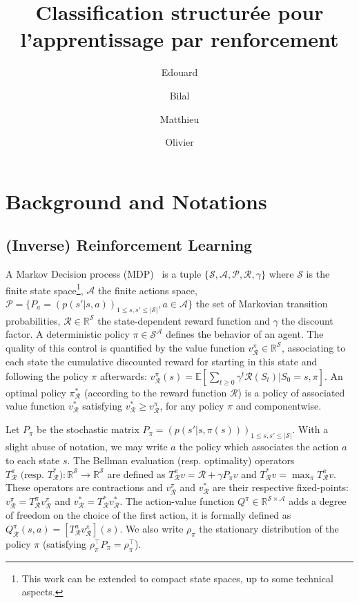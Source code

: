 \documentclass[english,utf8]{./hermes-journal}
\title[SCIRL]{Classification structurée pour l'apprentissage par renforcement}
\author[1,2]{Edouard}{Klein}
\author[2]{Bilal}{Piot}
\author[2,3]{Matthieu}{Geist}
\author[2,3]{Olivier}{Pietquin}
\newcommand{\p}{\mathcal{P}}
\newcommand{\R}{\mathcal{R}}
\newcommand{\s}{\mathcal{S}}
\newcommand{\A}{\mathcal{A}}
\newcommand{\E}{\mathbb{E}}
\begin{document}
\newtheorem{prop}[theorem]{Proposition}
\cite{Ng:2000}
\maketitle

\newpage

\section{Background and Notations}
\label{sec:background}

\subsection{(Inverse) Reinforcement Learning}
\label{subsec:background:irl}

A Markov Decision process (MDP)~\cite{Puterman:1994} is a tuple
$\{\s,\A,\p,\R,\gamma\}$ where $\s$ is the finite state
space\footnote{This work can be extended to compact state spaces, up
to some technical aspects.}, $\A$ the finite actions space, $\p =
\{P_a = (p(s'|s,a))_{1\leq s,s'\leq |\s|}, a\in\A\}$ the set of
Markovian transition probabilities, $\R\in\mathbb{R}^\s$ the
state-dependent reward function and $\gamma$ the discount factor. A
deterministic policy $\pi\in\s^\A$ defines the behavior of an agent.
The quality of this control is quantified by the value function
$v_\R^\pi\in\mathbb{R}^\s$, associating to each state the cumulative
discounted reward for starting in this state and following the
policy $\pi$ afterwards: $v_\R^\pi(s) = \E[\sum_{t\geq 0} \gamma^t
\R(S_t)|S_0=s,\pi]$. An optimal policy $\pi_\R^*$ (according to the
reward function $\R$) is a policy of associated value function
$v^*_\R$ satisfying $v_\R^* \geq v_\R^\pi$, for any policy $\pi$ and
componentwise.

Let $P_\pi$ be the stochastic matrix $P_\pi =
(p(s'|s,\pi(s)))_{1\leq s,s'\leq |\s|}$. With a slight abuse of
notation, we may write $a$ the policy which associates the action
$a$ to each state $s$. The Bellman evaluation (resp. optimality)
operators $T^\pi_\R\text{ (resp. $T^*_\R$)}:\mathbb{R}^\s
\rightarrow \mathbb{R}^\s$ are defined as $T^\pi_\R v = \R + \gamma
P_\pi v$ and $T_\R^*v = \max_\pi T_\R^\pi v$.
These operators are contractions and $v_\R^\pi$ and $v^*_\R$ are
their respective fixed-points: $v_\R^\pi = T^\pi_\R v_\R^\pi$ and
$v^*_\R = T^*_\R v^*_\R$. The action-value function
$Q^\pi\in\mathbb{R}^{\s\times \A}$ adds a degree of freedom on the
choice of the first action, it is formally defined as $Q_\R^\pi(s,a)
= [T^a_\R v^\pi_\R](s)$. We also write $\rho_\pi$ the stationary
distribution of the policy $\pi$ (satisfying $\rho_\pi^\top P_\pi =
\rho_\pi^\top$).
\end{document}
